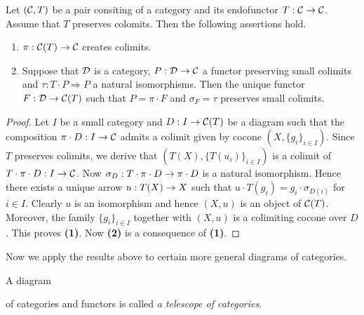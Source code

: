 \begin{theorem}\label{theorem:endoscope_colimits}
Let $({\mathcal C},T)$ be a pair consiting of a category and its endofunctor $T:{\mathcal C}\rightarrow {\mathcal C}$. Assume that $T$ preserves colomits. Then the following assertions hold.
\begin{enumerate}[label=\textbf{\emph{(\arabic*)}}, leftmargin=1.5em]
\item $\pi:{\mathcal C}(T)\rightarrow {\mathcal C}$ creates colimits.
\item Suppose that ${\mathcal D}$ is a category, $P:{\mathcal D}\rightarrow {\mathcal C}$ a functor preserving small colimits and $\tau:T\cdot P \Rightarrow P$ a natural isomorphisms. Then the unique functor $F:{\mathcal D} \rightarrow {\mathcal C}(T)$ such that $P = \pi\cdot F$ and $\sigma_F = \tau$ preserves small colimits.
\end{enumerate}
\end{theorem}
\begin{proof}
Let $I$ be a small category and $D:I\rightarrow {\mathcal C}(T)$ be a diagram such that the composition $\pi\cdot D:I\rightarrow {\mathcal C}$ admits a colimit given by cocone $(X,\{g_i\}_{i\in I})$. Since $T$ preserves colimits, we derive that $\left(T(X), \{T(u_i)\}_{i\in I}\right)$ is a colimit of $T\cdot \pi \cdot D:I\rightarrow {\mathcal C}$. Now $\sigma_D:T\cdot \pi\cdot D\rightarrow \pi\cdot D$ is a natural isomorphism. Hence there exists a unique arrow $u:T(X)\rightarrow X$ such that $u \cdot T(g_i) = g_i\cdot \sigma_{D(i)}$ for $i\in I$. Clearly $u$ is an isomorphism and hence $(X,u)$ is an object of ${\mathcal C}(T)$. Moreover, the family $\{g_i\}_{i\in I}$ together with $(X,u)$ is a colimiting cocone over $D$. This proves \textbf{(1)}. Now \textbf{(2)} is a consequence of \textbf{(1)}.
\end{proof}
\noindent
Now we apply the results above to certain more general diagrams of categories.

\begin{definition}
A diagram
\begin{center}   
\end{center}
of categories and functors is called \textit{a telescope of categories}.
\end{definition}

